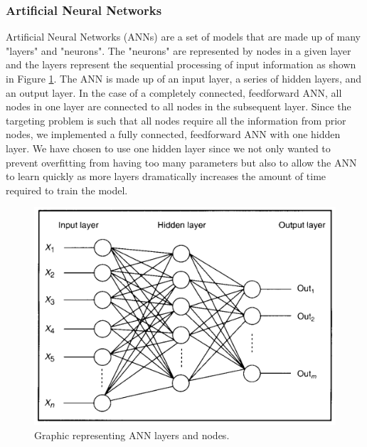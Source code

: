 \documentclass[11pt,letterpaper]{article}
\begin{document}
\subsubsection{Artificial Neural Networks}
Artificial Neural Networks (ANNs) are a set of models that are made up of many "layers" and "neurons". The "neurons" are represented by nodes in a given layer and the layers represent the sequential processing of input information as shown in Figure \ref{fig:NN}. The ANN is made up of an input layer, a series of hidden layers, and an output layer. In the case of a completely connected, feedforward ANN, all nodes in one layer are connected to all nodes in the subsequent layer. Since the targeting problem is such that all nodes require all the information from prior nodes, we implemented a fully connected, feedforward ANN with one hidden layer. We have chosen to use one hidden layer since we not only wanted to prevent overfitting from having too many parameters but also to allow the ANN to learn quickly as more layers dramatically increases the amount of time required to train the model.

\begin{figure}[h]
	\centering
	\includegraphics[scale = 0.8]{NN.png}
	\caption{Graphic representing ANN layers and nodes. }
	\label{fig:NN}
\end{figure}
\end{document}

